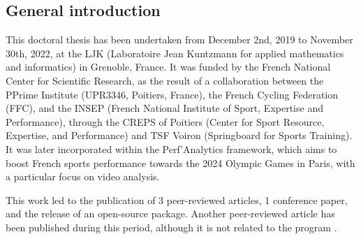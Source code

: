 {}

\vspace*{-1cm}
\begin{flushright}
\section*{\fontsize{20pt}{20pt}\selectfont\textnormal{General introduction}}
\end{flushright}
\vspace{2cm}

\chead[\fancyplain{}{}]
      {\fancyplain{}{}}
\lfoot[\fancyplain{}{}]%
      {\fancyplain{}{}}
\cfoot[\fancyplain{}{\thepage}]
      {\fancyplain{}{\thepage}}
\rfoot[\fancyplain{}{}]%
     {\fancyplain{}{\scriptsize}}
     


This doctoral thesis has been undertaken from December 2nd, 2019 to November 30th, 2022, at the LJK (Laboratoire Jean Kuntzmann for applied mathematics and informatics) in Grenoble, France. It was funded by the French National Center for Scientific Research, as the result of a collaboration between the PPrime Institute (UPR3346, Poitiers, France), the French Cycling Federation (FFC), and the INSEP (French National Institute of Sport, Expertise and Performance), through the CREPS of Poitiers (Center for Sport Resource, Expertise, and Performance) and TSF Voiron (Springboard for Sports Training). It was later incorporated within the Perf'Analytics framework, which aims to boost French sports performance towards the 2024 Olympic Games in Paris, with a particular focus on video analysis.

\vspace*{0.5cm}

This work led to the publication of 3 peer-reviewed articles, 1 conference paper, and the release of an open-source package. Another peer-reviewed article has been published during this period, although it is not related to the program \cite{Pagnon2022d}.

